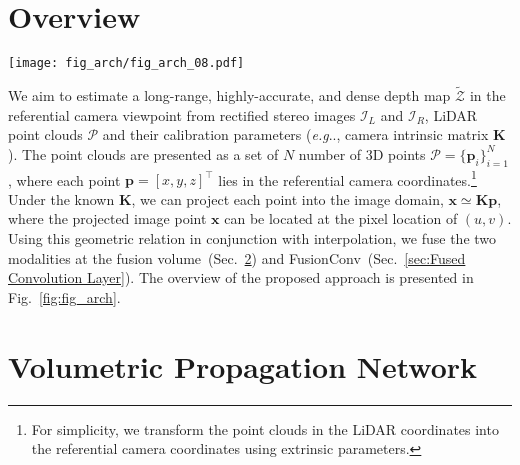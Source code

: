 \documentclass[letterpaper, 10 pt, conference]{ieeeconf}
\makeatletter
\DeclareRobustCommand\onedot{\futurelet\@let@token\@onedot}
\def\@onedot{\ifx\@let@token.\else.\null\fi\xspace}
\def\eg{\emph{e.g}\onedot} \def\Eg{{E.g}\onedot}
\newcommand{\Fref}[1]{Fig.~\textcolor{blue}{\ref{#1}}}
\newcommand{\Sref}[1]{Sec.~\textcolor{blue}{\ref{#1}}}
\makeatother
\begin{document}
\section{Overview}
\label{sec:Overview}

\begin{figure*}[!t]
\vspace{+3mm}
\centering
\texttt{[image: fig\_arch/fig\_arch\_08.pdf]}
\caption{\textbf{Overall architecture.} Our network consists of three stages: feature extraction stage, volume aggregation stage, and depth regression stage. We initially extract features from input modalities. In particular, we use FusionConv layers to infer point feature vectors ${\mathcal{F}_{\mathcal{P}}}$. These extracted features are embedded into the fusion volume $\mathcal{V}_{\mathcal{F}_{\mathcal{P}}}$ to compute the correspondence {with stereo feature maps $\mathcal{F}_{L}$, $\mathcal{F}_{R}$}. After volume aggregation through 3D stacked hourglass networks, we finally obtain the depth map $\widetilde{Z}$ in the referential camera view.
}
\label{fig:fig_arch}
\vspace{-4mm}
\end{figure*}

We aim to estimate a long-range, highly-accurate, and dense depth map $\widetilde{\mathcal{Z}}$ in the referential camera viewpoint from rectified stereo images $\mathcal{I}_{L}$ and $\mathcal{I}_{R}$, LiDAR point clouds $\mathcal{P}$ and their calibration parameters (\eg, camera intrinsic matrix $\mathbf{K}$). The point clouds are presented as a set of $N$ number of 3D points $\mathcal{P} {=} \{ \mathbf{p}_{i} \}_{i=1}^{N}$, where each point $\mathbf{p} {=} [x, y, z]^\top$ lies in the referential camera coordinates.\footnote{For simplicity, we transform the point clouds in the LiDAR coordinates into the referential camera coordinates using extrinsic parameters.} Under the known $\mathbf{K}$, we can project each point into the image domain, $\mathbf{x} \simeq \mathbf{K}\mathbf{p}$, where the projected image point $\mathbf{x}$ can be located at the pixel location of $(u, v)$. Using this geometric relation in conjunction with interpolation, we fuse the two modalities at the fusion volume~(\Sref{sec:Volumetric Propagation}) and FusionConv~(\Sref{sec:Fused Convolution Layer}). The overview of the proposed approach is presented in \Fref{fig:fig_arch}. 


\section{Volumetric Propagation Network}
\label{sec:Volumetric Propagation}
\end{document}
